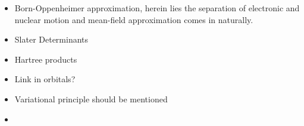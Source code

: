 \documentclass{subfiles}
\begin{document}
\begin{itemize}
    \item Born-Oppenheimer approximation, herein lies the separation of electronic and nuclear motion and mean-field approximation comes in naturally.
    \item Slater Determinants
    \item Hartree products
    \item Link in orbitals?
    \item Variational principle should be mentioned
    \item 
\end{itemize}

\end{document}
